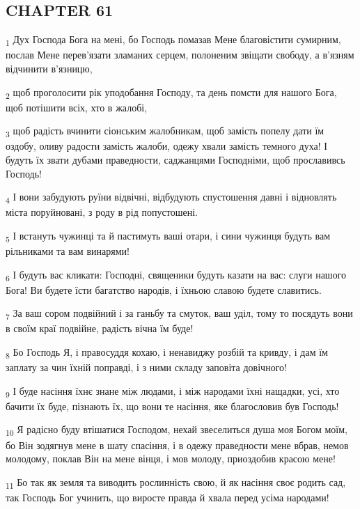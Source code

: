 \subsection{CHAPTER 61}
\begin{tcolorbox}
\textsubscript{1} Дух Господа Бога на мені, бо Господь помазав Мене благовістити сумирним, послав Мене перев'язати зламаних серцем, полоненим звіщати свободу, а в'язням відчинити в'язницю,
\end{tcolorbox}
\begin{tcolorbox}
\textsubscript{2} щоб проголосити рік уподобання Господу, та день помсти для нашого Бога, щоб потішити всіх, хто в жалобі,
\end{tcolorbox}
\begin{tcolorbox}
\textsubscript{3} щоб радість вчинити сіонським жалобникам, щоб замість попелу дати їм оздобу, оливу радости замість жалоби, одежу хвали замість темного духа! І будуть їх звати дубами праведности, саджанцями Господніми, щоб прославивсь Господь!
\end{tcolorbox}
\begin{tcolorbox}
\textsubscript{4} І вони забудують руїни відвічні, відбудують спустошення давні і відновлять міста поруйновані, з роду в рід попустошені.
\end{tcolorbox}
\begin{tcolorbox}
\textsubscript{5} І встануть чужинці та й пастимуть ваші отари, і сини чужинця будуть вам рільниками та вам винарями!
\end{tcolorbox}
\begin{tcolorbox}
\textsubscript{6} І будуть вас кликати: Господні, священики будуть казати на вас: слуги нашого Бога! Ви будете їсти багатство народів, і їхньою славою будете славитись.
\end{tcolorbox}
\begin{tcolorbox}
\textsubscript{7} За ваш сором подвійний і за ганьбу та смуток, ваш уділ, тому то посядуть вони в своїм краї подвійне, радість вічна їм буде!
\end{tcolorbox}
\begin{tcolorbox}
\textsubscript{8} Бо Господь Я, і правосуддя кохаю, і ненавиджу розбій та кривду, і дам їм заплату за чин їхній поправді, і з ними складу заповіта довічного!
\end{tcolorbox}
\begin{tcolorbox}
\textsubscript{9} І буде насіння їхнє знане між людами, і між народами їхні нащадки, усі, хто бачити їх буде, пізнають їх, що вони те насіння, яке благословив був Господь!
\end{tcolorbox}
\begin{tcolorbox}
\textsubscript{10} Я радісно буду втішатися Господом, нехай звеселиться душа моя Богом моїм, бо Він зодягнув мене в шату спасіння, і в одежу праведности мене вбрав, немов молодому, поклав Він на мене вінця, і мов молоду, приоздобив красою мене!
\end{tcolorbox}
\begin{tcolorbox}
\textsubscript{11} Бо так як земля та виводить рослинність свою, й як насіння своє родить сад, так Господь Бог учинить, що виросте правда й хвала перед усіма народами!
\end{tcolorbox}
